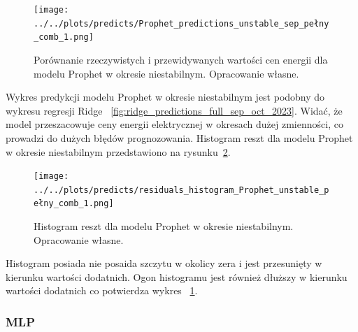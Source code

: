 \begin{figure}[H]
    \centering
    \texttt{[image: ../../plots/predicts/Prophet\_predictions\_unstable\_sep\_pełny\_comb\_1.png]}
    \caption{Porównanie rzeczywistych i przewidywanych wartości cen energii dla modelu Prophet w okresie niestabilnym. Opracowanie własne.}
    \label{fig:prophet_predictions_non_stable_period}
\end{figure}

Wykres predykcji modelu Prophet w okresie niestabilnym jest podobny do wykresu regresji Ridge ~\ref{fig:ridge_predictions_full_sep_oct_2023}. Widać, że model przeszacowuje ceny energii elektrycznej w okresach dużej zmienności, co prowadzi do dużych błędów prognozowania. Histogram reszt dla modelu Prophet w okresie niestabilnym przedstawiono na rysunku~\ref{fig:prophet_residuals_non_stable}.

\begin{figure}[H]
    \centering
    \texttt{[image: ../../plots/predicts/residuals\_histogram\_Prophet\_unstable\_pełny\_comb\_1.png]}
    \caption{Histogram reszt dla modelu Prophet w okresie niestabilnym. Opracowanie własne.}
    \label{fig:prophet_residuals_non_stable}
\end{figure}

Histogram posiada nie posaida szczytu w okolicy zera i jest przesunięty w kierunku wartości dodatnich. Ogon histogramu jest również dłuższy w kierunku wartości dodatnich co potwierdza wykres ~\ref{fig:prophet_predictions_non_stable_period}.



\subsubsection{MLP}